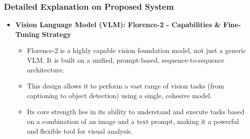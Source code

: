 
\begin{frame}
\frametitle{ Detailed Explanation on Proposed System}

\begin{itemize}
    \item \textbf{Vision Language Model (VLM): Florence-2 - Capabilities \& Fine-Tuning Strategy}
    
    \vspace{0.3cm}
    
    \begin{itemize}
        \item Florence-2 is a highly capable vision foundation model, not just a generic VLM. It is built on a unified, prompt-based, sequence-to-sequence architecture.
        
        \vspace{0.3cm}
        
        \item This design allows it to perform a vast range of vision tasks (from captioning to object detection) using a single, cohesive model.
        
        \vspace{0.3cm}
        
        \item Its core strength lies in its ability to understand and execute tasks based on a combination of an image and a text prompt, making it a powerful and flexible tool for visual analysis.
    \end{itemize}

\end{itemize}

\end{frame}